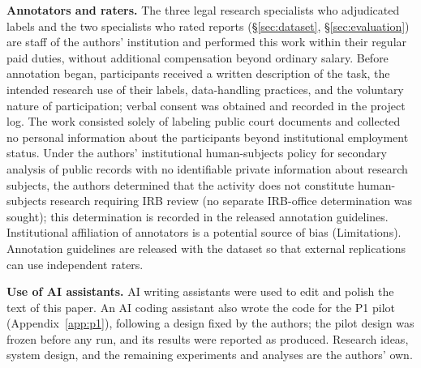 \textbf{Annotators and raters.}
The three legal research specialists who adjudicated labels and the two specialists who rated reports (\S\ref{sec:dataset}, \S\ref{sec:evaluation}) are staff of the authors' institution and performed this work within their regular paid duties, without additional compensation beyond ordinary salary. Before annotation began, participants received a written description of the task, the intended research use of their labels, data-handling practices, and the voluntary nature of participation; verbal consent was obtained and recorded in the project log. The work consisted solely of labeling public court documents and collected no personal information about the participants beyond institutional employment status. Under the authors' institutional human-subjects policy for secondary analysis of public records with no identifiable private information about research subjects, the authors determined that the activity does not constitute human-subjects research requiring IRB review (no separate IRB-office determination was sought); this determination is recorded in the released annotation guidelines. Institutional affiliation of annotators is a potential source of bias (Limitations). Annotation guidelines are released with the dataset so that external replications can use independent raters.

\textbf{Use of AI assistants.}
AI writing assistants were used to edit and polish the text of this paper. An AI coding assistant also wrote the code for the P1 pilot (Appendix~\ref{app:p1}), following a design fixed by the authors; the pilot design was frozen before any run, and its results were reported as produced. Research ideas, system design, and the remaining experiments and analyses are the authors' own.
